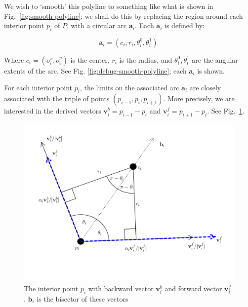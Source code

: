 \documentclass{article}
\begin{document}
We wish to `smooth' this polyline to something like what is shown in Fig.~\ref{fig:smooth-polyline}; we shall do this by replacing the region around each interior point $p_{i}$ of $P$, with a circular arc $\mathbf{a}_{i}$.  Each $\mathbf{a}_{i}$ is defined by:

\begin{equation}
  \label{eq:circ-def}
\mathbf{a}_i=\left(
  c_{i},
  r_{i},
  \theta^{0}_{i},
  \theta^{1}_{i}
\right)
\end{equation}

Where $c_{i} = (o^{x}_{i}, o^{y}_{i})$ is the center, $r_{i}$ is the radius, and $\theta^{0}_{i}, \theta^{1}_{i}$ are the angular extents of the arc.  See Fig. \ref{fig:debug-smooth-polyline}; each $\mathbf{a}_{i}$ is shown.

\begin{figure}[h]
\end{figure}

For each interior point $p_{i}$, the limits on the associated arc $\mathbf{a}_{i}$ are closely associated with the triple of points
$\left(
  p_{i-1}, p_{i}, p_{i+1}
\right)$.  More precisely, we are interested in the derived vectors $\mathbf{v}^{b}_{i} = p_{i-1} - p_{i}$ and $\mathbf{v}^{f}_{i} = p_{i+1} - p_{i}$. See Fig.~\ref{fig:interior-point}.

\begin{figure}[h]
  \centering
  \includegraphics[width=\columnwidth]{4}
  \caption{The interior point $p_{i}$ with backward vector $\mathbf{v}^{b}_{i}$ and forward vector $\mathbf{v}^{f}_{i}$. $\mathbf{b}_{i}$ is the bisector of these vectors}
  \label{fig:interior-point}
\end{figure}
\end{document}
